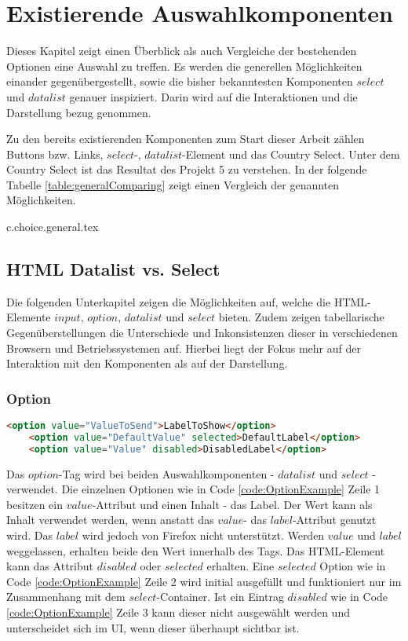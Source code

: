 \chapter{Existierende Auswahlkomponenten}

Dieses Kapitel zeigt einen Überblick als auch Vergleiche der bestehenden Optionen eine Auswahl zu treffen. 
Es werden die generellen Möglichkeiten einander gegenübergestellt, sowie die bisher bekanntesten Komponenten $select$ und $datalist$ genauer inspiziert.
Darin wird auf die Interaktionen und die Darstellung bezug genommen. 

Zu den bereits existierenden Komponenten zum Start dieser Arbeit zählen Buttons bzw. Links, $select$-, $datalist$-Element und das Country Select.
Unter dem Country Select ist das Resultat des Projekt 5 zu verstehen.
In der folgende Tabelle \ref{table:generalComparing} zeigt einen Vergleich der genannten Möglichkeiten.

{c.choice.general.tex}

\section{HTML Datalist vs. Select}

Die folgenden Unterkapitel zeigen die Möglichkeiten auf, welche die HTML-Elemente $input$, $option$, $datalist$ und $select$ bieten.
Zudem zeigen tabellarische Gegenüberstellungen die Unterschiede und Inkonsistenzen dieser in verschiedenen Browsern und Betriebssystemen auf.
Hierbei liegt der Fokus mehr auf der Interaktion mit den Komponenten als auf der Darstellung.


\subsection{Option}

\begin{lstlisting}[language = html, caption = Code: Option Example, label = code:OptionExample]
    <option value="ValueToSend">LabelToShow</option>
    <option value="DefaultValue" selected>DefaultLabel</option>
    <option value="Value" disabled>DisabledLabel</option>
\end{lstlisting}

Das $option$-Tag wird bei beiden Auswahlkomponenten - $datalist$ und $select$ - verwendet. 
Die einzelnen Optionen wie in Code \ref{code:OptionExample} Zeile 1 besitzen ein $value$-Attribut und einen Inhalt - das Label.
Der Wert kann als Inhalt verwendet werden, wenn anstatt das $value$- das $label$-Attribut genutzt wird.
Das $label$ wird jedoch von Firefox nicht unterstützt.
Werden $value$ und $label$ weggelassen, erhalten beide den Wert innerhalb des Tags.
Das HTML-Element kann das Attribut $disabled$ oder $selected$ erhalten.
Eine $selected$ Option wie in Code \ref{code:OptionExample} Zeile 2 wird initial ausgefüllt und funktioniert nur im Zusammenhang mit dem $select$-Container. 
Ist ein Eintrag $disabled$ wie in Code \ref{code:OptionExample} Zeile 3 kann dieser nicht ausgewählt werden und unterscheidet sich im UI, wenn dieser überhaupt sichtbar ist.

